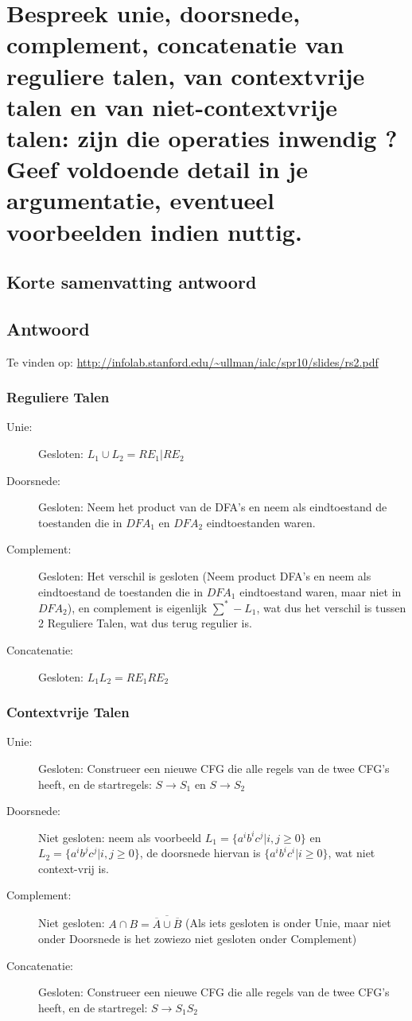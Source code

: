 \documentclass{article}
\begin{document}
\section{Bespreek unie, doorsnede, complement, concatenatie van reguliere talen, van contextvrije talen en van niet-contextvrije talen: zijn die operaties inwendig ? Geef voldoende detail in je argumentatie, eventueel voorbeelden indien nuttig.}
    \subsection{Korte samenvatting antwoord}

    \subsection{Antwoord}
        Te vinden op: \url{http://infolab.stanford.edu/~ullman/ialc/spr10/slides/rs2.pdf}
        \subsubsection{Reguliere Talen}
            \begin{description}
                \item[Unie:] Gesloten: $L_1 \cup L_2 = RE_1|RE_2$
                \item[Doorsnede:] Gesloten: Neem het product van de DFA's en neem als eindtoestand de toestanden die in $DFA_1$ en $DFA_2$ eindtoestanden waren.
                \item[Complement:] Gesloten: Het verschil is gesloten (Neem product DFA's en neem als eindtoestand de toestanden die in $DFA_1$ eindtoestand waren, maar niet in $DFA_2$), en complement is eigenlijk $\sum^* - L_1$, wat dus het verschil is tussen 2 Reguliere Talen, wat dus terug regulier is.
                \item[Concatenatie:] Gesloten: $L_1  L_2 = RE_1RE_2$
            \end{description}
        \subsubsection{Contextvrije Talen}
            \begin{description}
                \item[Unie:] Gesloten: Construeer een nieuwe CFG die alle regels van de twee CFG's heeft, en de startregels: $S \rightarrow S_1$ en  $S \rightarrow S_2$
                \item[Doorsnede:] Niet gesloten: neem als voorbeeld $L_1 = \{a^i b^i c^j \vert  i,j \geq 0\}$ en $L_2 = \{a^i b^j c^j \vert  i,j \geq 0\}$, de doorsnede hiervan is $\{a^i b^i c^i  \vert  i \geq 0\}$, wat niet context-vrij is.
                \item[Complement:] Niet gesloten: $A \cap B = \overline{\overline{A} \cup \overline{B}}$ (Als iets gesloten is onder Unie, maar niet onder Doorsnede is het zowiezo niet gesloten onder Complement)
                \item[Concatenatie:] Gesloten: Construeer een nieuwe CFG die alle regels van de twee CFG's heeft, en de startregel: $S \rightarrow S_1S_2$
            \end{description}
\end{document}

